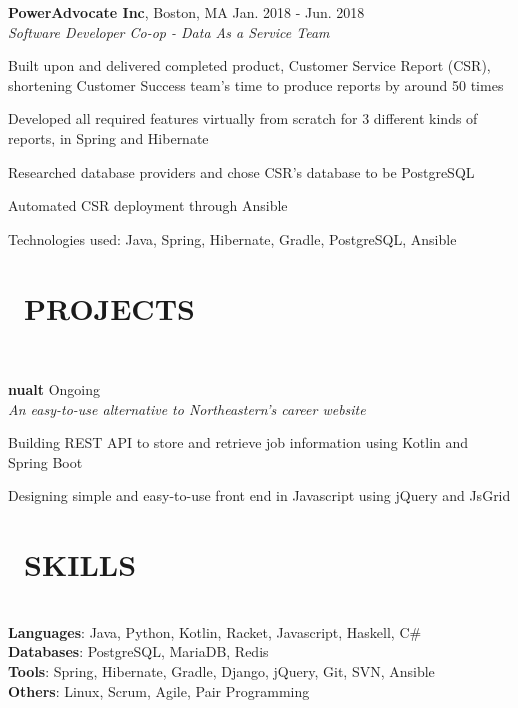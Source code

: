 \documentclass[11pt]{res}
\newcommand{\sectionunderline}{\vspace{-3mm}\hrulefill\\}
\newcommand{\listingtab}{\tabto{3.5cm}}
\newcommand{\newsect}[1]{\section{\Large \bf #1}}
\begin{document}
\begin{resume}
{{      {\bf PowerAdvocate Inc}, Boston, MA \hfill Jan. 2018 - Jun. 2018\\
      {\it Software Developer Co-op - Data As a Service Team}
      \begin{itemize}
        {\item Built upon and delivered completed product, Customer Service Report (CSR), shortening Customer Success team's time to produce reports by around 50 times}
        {\item Developed all required features virtually from scratch for 3 different kinds of reports, in Spring and Hibernate}
        {\item Researched database providers and chose CSR's database to be PostgreSQL}
        {\item Automated CSR deployment through Ansible}
        {\item Technologies used: Java, Spring, Hibernate, Gradle, PostgreSQL, Ansible}
      \end{itemize}
    }
  }

  \newsect{\faGithubAlt\ PROJECTS}{
    \sectionunderline{
      {\bf nualt} \hfill Ongoing\\
      {\it An easy-to-use alternative to Northeastern's career website}
      \begin{itemize}
        {\item {}}
        {\item Building REST API to store and retrieve job information using Kotlin and Spring Boot}
        {\item Designing simple and easy-to-use front end in Javascript using jQuery and JsGrid}
      \end{itemize}
    }
  }

  \newsect{\faCogs\ SKILLS}{
    \sectionunderline{
      {\bf Languages}: \listingtab Java, Python, Kotlin, Racket, Javascript, Haskell, C\#\\
      {\bf Databases}: \listingtab PostgreSQL, MariaDB, Redis\\
      {\bf Tools}: \listingtab Spring, Hibernate, Gradle, Django, jQuery, Git, SVN, Ansible\\
      {\bf Others}: \listingtab Linux, Scrum, Agile, Pair Programming
    }
  }
\end{resume}
\end{document}
